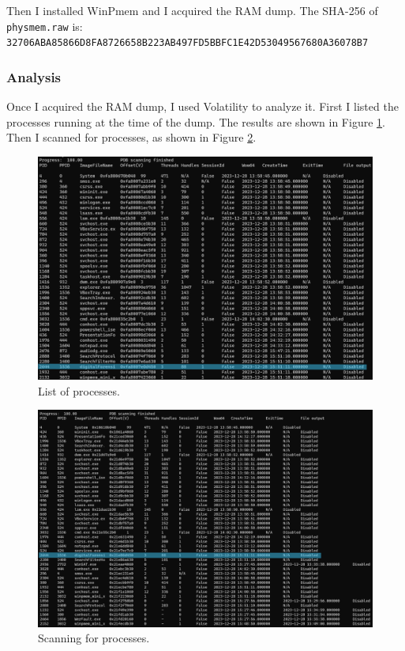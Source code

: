 \documentclass[12pt]{article}
\begin{document}
Then I installed WinPmem and I acquired the RAM dump. The SHA-256 of \texttt{physmem.raw} is:\\
\texttt{32706ABA85866D8FA8726658B223AB497FD5BBFC1E42D53049567680A36078B7}

\subsubsection{Analysis}

Once I acquired the RAM dump, I used Volatility to analyze it. First I listed the processes running at the time of the dump. The results are shown in Figure \ref{fig:pslist}. Then I scanned for processes, as shown in Figure \ref{fig:psscan}.

\begin{figure}
        \centering
        \includegraphics[width=\textwidth]{images/pslist.png}
        \caption{List of processes.}
        \label{fig:pslist}
\end{figure}

\begin{figure}
        \centering
        \includegraphics[width=\textwidth]{images/psscan.png}
        \caption{Scanning for processes.}
        \label{fig:psscan}
\end{figure}
\end{document}
